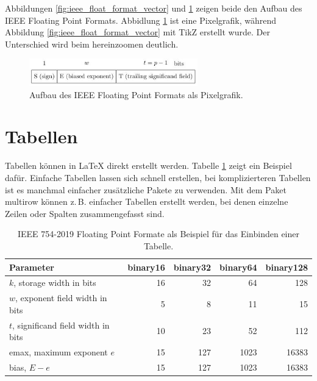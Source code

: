 Abbildungen \ref{fig:ieee_float_format_vector} und \ref{fig:ieee_float_format_pixel} zeigen beide den Aufbau des IEEE Floating Point Formats. Abbidlung \ref{fig:ieee_float_format_pixel} ist eine Pixelgrafik, während Abbildung \ref{fig:ieee_float_format_vector} mit TikZ erstellt wurde. Der Unterschied wird beim hereinzoomen deutlich.

\begin{figure}[ht]
\centering
\includegraphics[width=0.65\textwidth]{figures/ieee_float_format.jpg}
\caption{Aufbau des IEEE Floating Point Formats als Pixelgrafik.}
\label{fig:ieee_float_format_pixel}
\end{figure}

\section{Tabellen}
Tabellen können in \LaTeX{} direkt erstellt werden. Tabelle \ref{tab:ieee_formats} zeigt ein Beispiel dafür. Einfache Tabellen lassen sich schnell erstellen, bei komplizierteren Tabellen ist es manchmal einfacher zusätzliche Pakete zu verwenden. Mit dem Paket multirow \cite{multirow} können z.\,B. einfacher Tabellen erstellt werden, bei denen einzelne Zeilen oder Spalten zusammengefasst sind.

\begin{table}[ht]
\centering
\begin{tabular}{|l|r|r|r|r|} 
 \hline
 Parameter & binary16 & binary32 & binary64 & binary128 \\
 \hline
  $k$, storage width in bits           & 16 &  32 &   64 &   128 \\ 
  $w$, exponent field width in bits    &  5 &   8 &   11 &    15 \\
  $t$, significand field width in bits & 10 &  23 &   52 &   112 \\
  emax, maximum exponent $e$           & 15 & 127 & 1023 & 16383 \\
  bias, $E-e$                          & 15 & 127 & 1023 & 16383 \\
 \hline
\end{tabular}
\caption{IEEE 754-2019 Floating Point Formate als Beispiel für das Einbinden einer Tabelle.}
\label{tab:ieee_formats}
\end{table}

